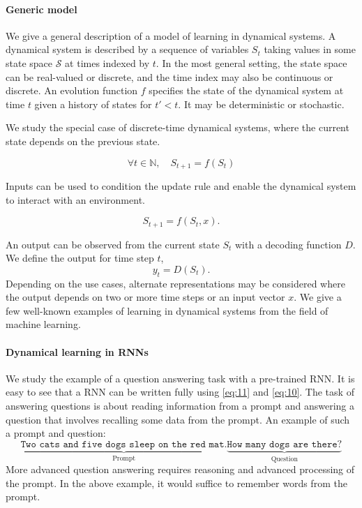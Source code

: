 \paragraph{Generic model}\label{sec:generic-model}
We give a general description of a model of learning in dynamical systems. A
dynamical system is described by a sequence of variables $S_{t}$ taking values
in some state space $\mathcal{S}$ at times indexed by $t$. In the most general setting, the
state space can be real-valued or discrete, and the time index may also be
continuous or discrete. An evolution function $f$ specifies the state of the
dynamical system at time $t$ given a history of states for $t' < t$. It may be
deterministic or stochastic.

We study the special case of discrete-time dynamical systems, where the current
state depends on the previous state.

\begin{equation}
  \forall t \in \mathbb{N},\quad S_{t + 1} = f(S_{t})
  \label{eq:dyn-update}
\end{equation}

Inputs can be used to condition the update rule and enable the dynamical system
to interact with an environment.

\begin{equation}
S_{t+1} = f(S_t, x).
\label{eq:11}
\end{equation}

An output can be observed from the current state $S_t$ with a decoding function
$D$. We define the output for time step $t$,
\begin{equation}
  \label{eq:10}
  y_t = D(S_t).
\end{equation}
Depending on the use cases, alternate representations may be considered where
the output depends on two or more time steps or an input vector $x$.
We give a few well-known examples of learning in dynamical systems from the
field of machine learning.

\paragraph{Dynamical learning in \acp{RNN}}\label{sec:dynam-learn-acprnn}
We study the example of a question answering task with a pre-trained \ac{RNN}.
It is easy to see that a \ac{RNN} can be written fully using \eqref{eq:11} and
\eqref{eq:10}. The task of answering questions is about reading information from
a prompt and answering a question that involves recalling some data from the
prompt. An example of such a prompt and question:
\begin{equation*}
  \underbrace{\texttt{Two cats and five dogs sleep on the red mat.}}_{\text{Prompt}}
  \underbrace{\texttt{How many dogs are there?}}_{\text{Question}}
\end{equation*}
More advanced question answering requires reasoning and advanced processing of
the prompt. In the above example, it would suffice to remember words from the
prompt.


